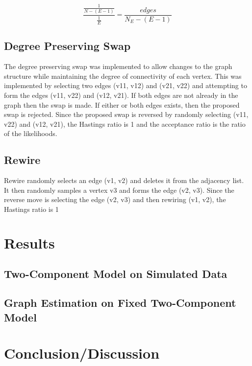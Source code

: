 \documentclass[]{article}
\numberwithin{equation}{section}
\begin{document}
\[ \frac{\frac{1}{N - (E - 1)}}{\frac{1}{ E}} = \frac{edges}{N_E-(E-1)} \]

\hypertarget{degree-preserving-swap}{%
\subsection{Degree Preserving Swap}\label{degree-preserving-swap}}

The degree preserving swap was implemented to allow changes to the graph
structure while maintaining the degree of connectivity of each vertex.
This was implemented by selecting two edges (v11, v12) and (v21, v22)
and attempting to form the edges (v11, v22) and (v12, v21). If both
edges are not already in the graph then the swap is made. If either or
both edges exists, then the proposed swap is rejected. Since the
proposed swap is reversed by randomly selecting (v11, v22) and (v12,
v21), the Hastings ratio is 1 and the acceptance ratio is the ratio of
the likelihoods.

\hypertarget{rewire}{%
\subsection{Rewire}\label{rewire}}

Rewire randomly selects an edge (v1, v2) and deletes it from the
adjacency list. It then randomly samples a vertex v3 and forms the edge
(v2, v3). Since the reverse move is selecting the edge (v2, v3) and then
rewiring (v1, v2), the Hastings ratio is 1

\hypertarget{results}{%
\section{Results}\label{results}}

\hypertarget{two-component-model-on-simulated-data}{%
\subsection{Two-Component Model on Simulated
Data}\label{two-component-model-on-simulated-data}}

\hypertarget{graph-estimation-on-fixed-two-component-model}{%
\subsection{Graph Estimation on Fixed Two-Component
Model}\label{graph-estimation-on-fixed-two-component-model}}

\hypertarget{conclusiondiscussion}{%
\section{Conclusion/Discussion}\label{conclusiondiscussion}}
\end{document}
